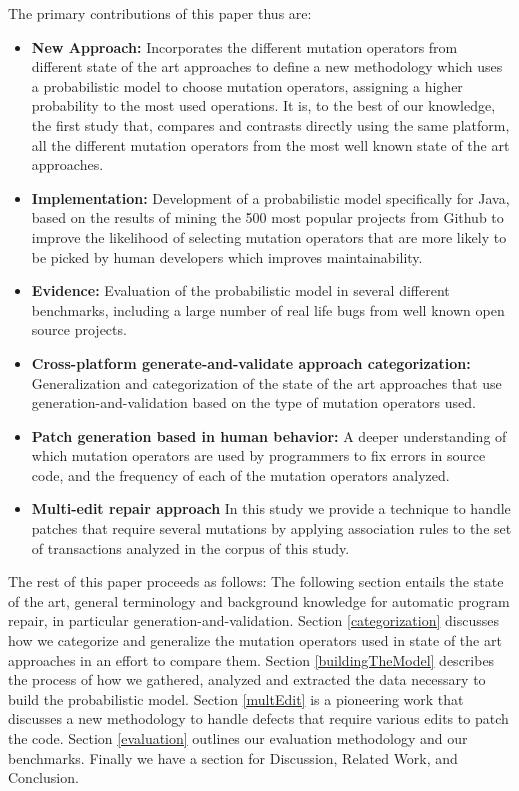 \documentclass[conference]{IEEEtran}
\begin{document}
The primary contributions of this paper thus are:
\begin{itemize}
  \item \textbf{New Approach:} Incorporates the different mutation operators from different state of the art approaches to define a new methodology which uses a probabilistic model to choose mutation operators, assigning a higher probability to the most used operations. It is, to the best of our knowledge, the first study that, compares and contrasts directly using the same platform, all the different mutation operators from the most well known state of the art approaches. 
  \item \textbf{Implementation:} Development of a probabilistic model specifically for Java, based on the results of mining the 500 most popular projects from Github to improve the likelihood of selecting mutation operators that are more likely to be picked by human developers which improves maintainability.
  \item \textbf{Evidence:} Evaluation of the probabilistic model in several different benchmarks, including a large number of real life bugs from well known open source projects.
  \item \textbf{Cross-platform generate-and-validate approach categorization:} Generalization and categorization of the state of the art approaches that use generation-and-validation based on the type of mutation operators used.
  \item \textbf{Patch generation based in human behavior:} A deeper understanding of which mutation operators are used by programmers to fix errors in source code, and the frequency of each of the mutation operators analyzed.
  \item \textbf{Multi-edit repair approach} In this study we provide a technique to handle patches that require several mutations by applying association rules to the set of transactions analyzed in the corpus of this study.  
\end{itemize}

The rest of this paper proceeds as follows:
The following section entails the state of the art, general terminology and background knowledge for automatic program repair, in particular generation-and-validation. Section \ref{categorization} discusses how we categorize and generalize the mutation operators used in state of the art approaches in an effort to compare them. Section \ref{buildingTheModel} describes the process of how we gathered, analyzed and extracted the data necessary to build the probabilistic model. Section \ref{multEdit} is a pioneering work that discusses a new methodology to handle defects that require various edits to patch the code. Section \ref{evaluation} outlines our evaluation methodology and our benchmarks.  Finally we have a section for Discussion, Related Work, and Conclusion.
\end{document}
